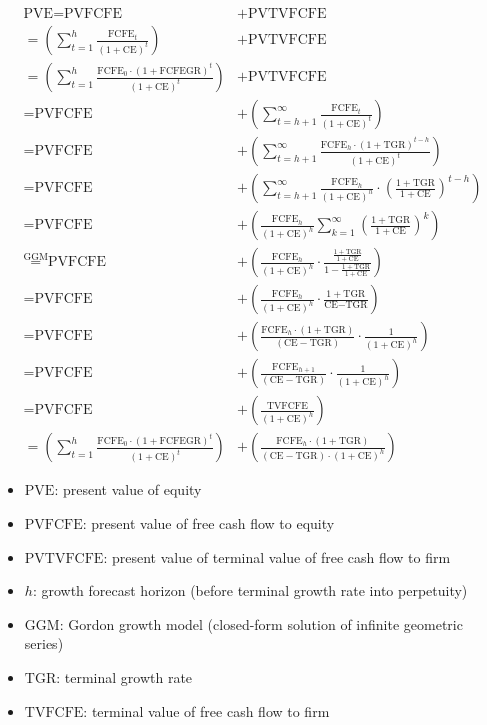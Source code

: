 $$
\begin{aligned}
\text{PVE} = \text{PVFCFE} &+ \text{PVTVFCFE} \\ 
= \left( \sum_{t=1}^{h} \frac{\text{FCFE}_t}{(1 + \text{CE})^t} \right) &+ \text{PVTVFCFE} \\
= \left( \sum_{t=1}^{h} \frac{\text{FCFE}_0 \cdot (1+\text{FCFEGR})^t}{(1+\text{CE})^t} \right) &+ \text{PVTVFCFE} \\
= \text{PVFCFE} &+ \left( \sum_{t=h+1}^{\infty} \frac{\text{FCFE}_t}{(1 + \text{CE})^t} \right) \\
= \text{PVFCFE} &+ \left( \sum_{t=h+1}^{\infty} \frac{\text{FCFE}_h \cdot (1+\text{TGR})^{t-h}}{(1+\text{CE})^t} \right) \\
= \text{PVFCFE} &+ \left( \sum_{t=h+1}^{\infty} \frac{\text{FCFE}_h}{(1+\text{CE})^h} \cdot \left( \frac{1+\text{TGR}}{1+\text{CE}} \right)^{t-h} \right) \\
= \text{PVFCFE} &+ \left( \frac{\text{FCFE}_h}{(1+\text{CE})^h} \sum_{k=1}^{\infty} \left( \frac{1+\text{TGR}}{1+\text{CE}} \right)^k \right) \\
\overset{\text{GGM}}{=} \text{PVFCFE} &+ \left( \frac{\text{FCFE}_h}{(1+\text{CE})^h} \cdot \frac{\frac{1+\text{TGR}}{1+\text{CE}}}{1 - \frac{1+\text{TGR}}{1+\text{CE}}} \right) \\
= \text{PVFCFE} &+ \left( \frac{\text{FCFE}_h}{(1+\text{CE})^h} \cdot \frac{1+\text{TGR}}{\text{CE} - \text{TGR}} \right) \\
= \text{PVFCFE} &+ \left( \frac{\text{FCFE}_h \cdot (1+\text{TGR})}{(\text{CE} - \text{TGR})} \cdot \frac{1}{(1+\text{CE})^h} \right) \\ 
= \text{PVFCFE} &+ \left(\frac{\text{FCFE}_{h+1}}{(\text{CE} - \text{TGR})} \cdot \frac{1}{(1 + \text{CE})^h} \right) \\
= \text{PVFCFE} &+ \left(\frac{\text{TVFCFE}}{(1 + \text{CE})^h} \right) \\ 
= \left( \sum_{t=1}^{h} \frac{\text{FCFE}_0 \cdot (1+\text{FCFEGR})^t}{(1+\text{CE})^t} \right) &+ \left(\frac{\text{FCFE}_h \cdot (1+\text{TGR})}{(\text{CE} - \text{TGR}) \cdot (1 + \text{CE})^h} \right)
\end{aligned}
$$

\begin{itemize}
  \item[] $\text{PVE}$: present value of equity
  \item[] $\text{PVFCFE}$: present value of free cash flow to equity
  \item[] $\text{PVTVFCFE}$: present value of terminal value of free cash flow to firm
  \item[] $h$: growth forecast horizon (before terminal growth rate into perpetuity)
  \item[] $\text{GGM}$: Gordon growth model (closed-form solution of infinite geometric series)
  \item[] $\text{TGR}$: terminal growth rate
  \item[] $\text{TVFCFE}$: terminal value of free cash flow to firm
\end{itemize}

